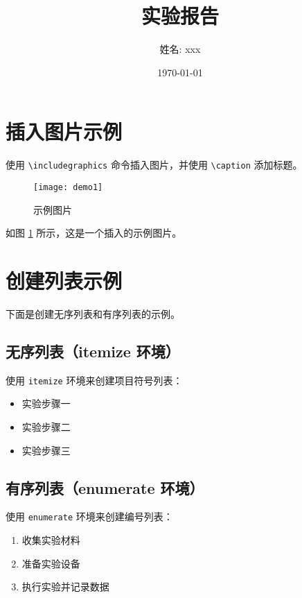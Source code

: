 \documentclass[12pt]{article}
\title{实验报告}
\author{姓名: xxx}
\date{\today}  %
\begin{document}
\maketitle  %

\section{插入图片示例}

使用 \texttt{\textbackslash includegraphics} 命令插入图片，并使用 \texttt{\textbackslash caption} 添加标题。

\begin{figure}[h]  %
    \centering
    \texttt{[image: demo1]}  %
    \caption{示例图片}
    \label{fig:example_image}
\end{figure}

如图 \ref{fig:example_image} 所示，这是一个插入的示例图片。

\section{创建列表示例}

下面是创建无序列表和有序列表的示例。

\subsection{无序列表（itemize 环境）}
使用 \texttt{itemize} 环境来创建项目符号列表：

\begin{itemize}
    \item 实验步骤一
    \item 实验步骤二
    \item 实验步骤三
\end{itemize}

\subsection{有序列表（enumerate 环境）}
使用 \texttt{enumerate} 环境来创建编号列表：

\begin{enumerate}
    \item 收集实验材料
    \item 准备实验设备
    \item 执行实验并记录数据
\end{enumerate}
\end{document}
